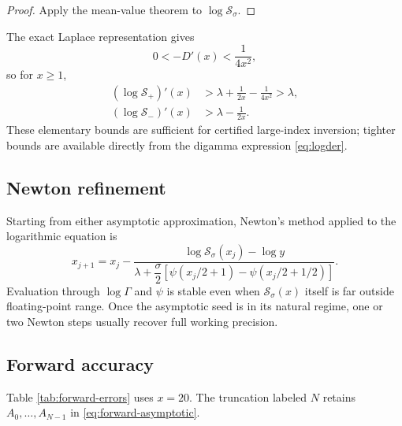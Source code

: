 \documentclass[11pt,a4paper]{article}
\numberwithin{equation}{section}
\theoremstyle{definition}
\theoremstyle{remark}
\begin{document}
\begin{proof}
Apply the mean-value theorem to \(\log\mathcal S_\sigma\).
\end{proof}

The exact Laplace representation gives
\begin{equation}\label{eq:Dprime-bound}
 0<-D'(x)<\frac1{4x^2},
\end{equation}
so for \(x\ge1\),
\begin{align}
 (\log\mathcal S_+)'(x)
 &>\lambda+\frac1{2x}-\frac1{4x^2}>\lambda,
 \label{eq:odd-derivative-lower}\\
 (\log\mathcal S_-)'(x)
 &>\lambda-\frac1{2x}.
 \label{eq:even-derivative-lower}
\end{align}
These elementary bounds are sufficient for certified large-index inversion;
tighter bounds are available directly from the digamma expression
\cref{eq:logder}.

\subsection{Newton refinement}

Starting from either asymptotic approximation, Newton's method applied to the
logarithmic equation is
\begin{equation}\label{eq:Newton}
 x_{j+1}=x_j-
 \frac{\log\mathcal S_\sigma(x_j)-\log y}
 {\lambda+\dfrac\sigma2
  [\psi(x_j/2+1)-\psi(x_j/2+1/2)]}.
\end{equation}
Evaluation through \(\log\Gamma\) and \(\psi\) is stable even when
\(\mathcal S_\sigma(x)\) itself is far outside floating-point range.  Once
the asymptotic seed is in its natural regime, one or two Newton steps usually
recover full working precision.

\subsection{Forward accuracy}

Table \ref{tab:forward-errors} uses \(x=20\).  The truncation labeled \(N\)
retains \(A_0,\ldots,A_{N-1}\) in \cref{eq:forward-asymptotic}.
\end{document}

